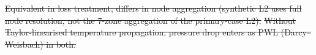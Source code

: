 \documentclass[a4paper,fleqn]{cas-sc} %
\providecommand{\DIFdel}[1]{{\protect\color{red}\sout{#1}}} %
\providecommand{\DIFdelFL}[1]{\DIFdel{#1}} %
\providecommand{\Lplus}{\ensuremath{\mathrm{L3^{+}}}}
\providecommand{\Cref}[1]{\ref{#1}}
\begin{document}
{{%
\DIFdelFL{Equivalent in loss treatment; differs in node
    aggregation (synthetic L2 uses full node resolution, not
    the 7-zone aggregation of the primary-case L2). }%
\DIFdelFL{Without Taylor-linearised temperature propagation;
    pressure drop enters as PWL (Darcy--Weisbach) in both.
}%

}}
\end{document}
